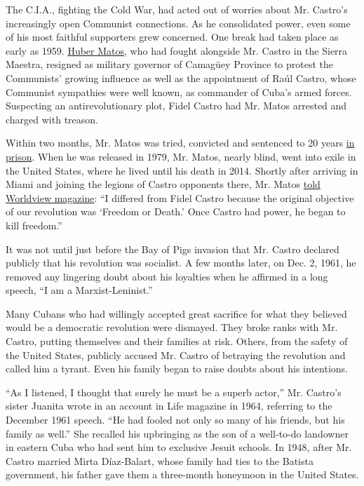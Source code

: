 The C.I.A., fighting the Cold War, had acted out of worries about Mr.
Castro's increasingly open Communist connections. As he consolidated
power, even some of his most faithful supporters grew concerned. One
break had taken place as early as 1959.
\href{http://www.nytimes.com/2014/03/01/world/americas/huber-matos-comrade-of-castro-then-adversary-dies-at-95.html}{Huber
Matos}, who had fought alongside Mr. Castro in the Sierra Maestra,
resigned as military governor of Camagüey Province to protest the
Communists' growing influence as well as the appointment of Raúl Castro,
whose Communist sympathies were well known, as commander of Cuba's armed
forces. Suspecting an antirevolutionary plot, Fidel Castro had Mr. Matos
arrested and charged with treason.

Within two months, Mr. Matos was tried, convicted and sentenced to 20
years
\href{http://query.nytimes.com/gst/abstract.html?res=9500EFDE1F39E63BBC4F52DFB767838E669EDE}{in
prison}. When he was released in 1979, Mr. Matos, nearly blind, went
into exile in the United States, where he lived until his death in 2014.
Shortly after arriving in Miami and joining the legions of Castro
opponents there, Mr. Matos
\href{http://worldview.carnegiecouncil.org/archive/worldview/1980/04/3361.html/_res/id=sa_File1/v23_i004_a002.pdf}{told
Worldview magazine}: ``I differed from Fidel Castro because the original
objective of our revolution was `Freedom or Death.' Once Castro had
power, he began to kill freedom.''

It was not until just before the Bay of Pigs invasion that Mr. Castro
declared publicly that his revolution was socialist. A few months later,
on Dec. 2, 1961, he removed any lingering doubt about his loyalties when
he affirmed in a long speech, ``I am a Marxist-Leninist.''

Many Cubans who had willingly accepted great sacrifice for what they
believed would be a democratic revolution were dismayed. They broke
ranks with Mr. Castro, putting themselves and their families at risk.
Others, from the safety of the United States, publicly accused Mr.
Castro of betraying the revolution and called him a tyrant. Even his
family began to raise doubts about his intentions.

``As I listened, I thought that surely he must be a superb actor,'' Mr.
Castro's sister Juanita wrote in an account in Life magazine in 1964,
referring to the December 1961 speech. ``He had fooled not only so many
of his friends, but his family as well.'' She recalled his upbringing as
the son of a well-to-do landowner in eastern Cuba who had sent him to
exclusive Jesuit schools. In 1948, after Mr. Castro married Mirta
Díaz-Balart, whose family had ties to the Batista government, his father
gave them a three-month honeymoon in the United States.


